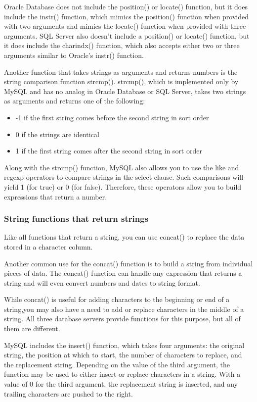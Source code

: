 \begin{tcolorbox}
    Oracle Database does not include the position() or locate() function, but it does include the instr() function, which mimics the position() function when provided with two arguments and mimics the locate() function when provided with three arguments. SQL Server also doesn't include a position() or locate() function, but it does include the charindx() function, which also accepts either two or three arguments similar to Oracle's instr() function.
\end{tcolorbox}

Another function that takes strings as arguments and returns numbers is the string
comparison function strcmp(). strcmp(), which is implemented only by MySQL and
has no analog in Oracle Database or SQL Server, takes two strings as arguments and
returns one of the following:
\begin{itemize}
    \item -1 if the first string comes before the second string in sort order
    \item 0 if the strings are identical
    \item 1 if the first string comes after the second string in sort order
\end{itemize}

Along with the strcmp() function, MySQL also allows you to use the like and regexp operators to compare strings in the select clause. Such comparisons will yield 1 (for true) or 0 (for false). Therefore, these operators allow you to build expressions that return a number.

\subsubsection*{String functions that return strings}
Like all functions that return a string, you can use concat() to replace the data stored in a character column.

Another common use for the concat() function is to build a string from individual pieces of data. The concat() function can handle any expression that returns a string and will even convert numbers and dates to string format.

While concat() is useful for adding characters to the beginning or end of a string,you may also have a need to add or replace characters in the middle of a string. All three database servers provide functions for this purpose, but all of them are different.

MySQL includes the insert() function, which takes four arguments: the original string, the position at which to start, the number of characters to replace, and the replacement string. Depending on the value of the third argument, the function may be used to either insert or replace characters in a string. With a value of 0 for the third argument, the replacement string is inserted, and any trailing characters are pushed to the right.

